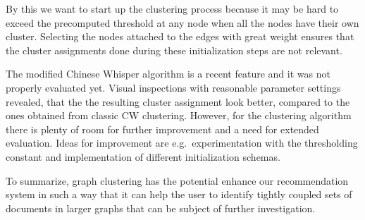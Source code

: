 By this we want to start up the clustering process because it may be hard to exceed the precomputed threshold at any node when all the nodes have their own cluster. Selecting the nodes attached to the edges with great weight ensures that the cluster assignments done during these initialization steps are not relevant.

The modified Chinese Whisper algorithm is a recent feature and it was not properly evaluated yet.
Visual inspections with reasonable parameter settings revealed, that the the resulting cluster
assignment look better, compared to the ones obtained from classic CW clustering. However, for the
clustering algorithm there is plenty of room for further improvement and a need for extended
evaluation. Ideas for improvement are e.g.\ experimentation with the thresholding constant
and implementation of different initialization schemas.

To summarize, graph clustering has the potential enhance our recommendation system in such a way
that it can help the user to identify tightly coupled sets of documents in larger graphs that
can be subject of further investigation.

